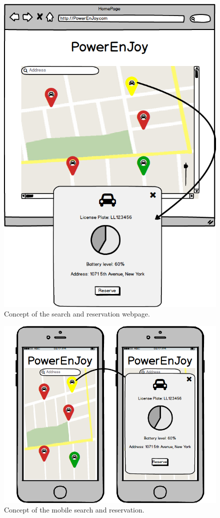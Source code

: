 \begin{figure}[H]
	\centering
	\includegraphics[width=\textwidth]{mockup/WebSearch.png}
	\caption{Concept of the search and reservation webpage.}
\end{figure}

\begin{figure}[H]
	\centering
	\includegraphics[width=\textwidth]{mockup/MobileSearch.png}
	\caption{Concept of the mobile search and reservation.}
\end{figure}

